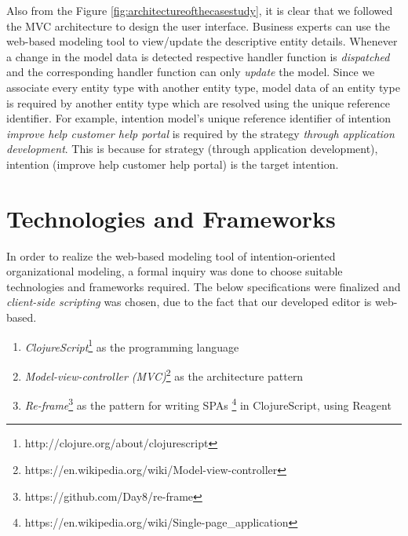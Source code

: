 Also from the Figure \ref{fig:architectureofthecasestudy}, it is clear that we followed the MVC architecture to design the user interface. Business experts can use the web-based modeling tool to view/update the descriptive entity details. Whenever a change in the model data is detected respective handler function is \textit{dispatched} and the corresponding handler function can only \textit{update} the model. Since we associate every entity type with another entity type, model data of an entity type is required by another entity type which are resolved using the unique reference identifier. For example, intention model's unique reference identifier of intention \textit{improve help customer help portal} is required by the strategy \textit{through application development}. This is because for strategy (through application development), intention (improve help customer help portal) is the target intention. 

\section{Technologies and Frameworks}
\label{subsec:specifications}
In order to realize the web-based modeling tool of intention-oriented organizational modeling, a formal inquiry was done to choose suitable technologies and frameworks required. The below specifications were finalized and \textit{client-side scripting} \cite{Sierra2012} was chosen, due to the fact that our developed editor is web-based. 

\begin{enumerate}   
	\item \textit{ClojureScript}\footnote{http://clojure.org/about/clojurescript} as the programming language
	\item \textit{Model-view-controller (MVC)}\footnote{https://en.wikipedia.org/wiki/Model-view-controller}  as the architecture pattern
	\item \textit{Re-frame}\footnote{https://github.com/Day8/re-frame} as the pattern for writing SPAs \footnote{https://en.wikipedia.org/wiki/Single-page\_application} in ClojureScript, using Reagent	
\end{enumerate}

